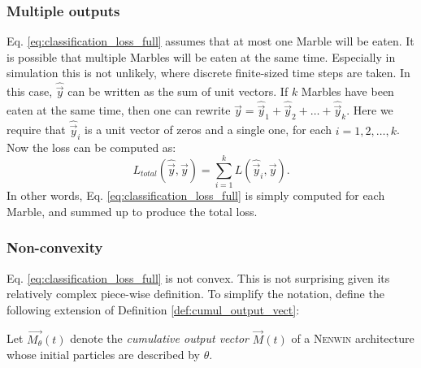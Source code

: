 \subsubsection{Multiple outputs}
Eq. \eqref{eq:classification_loss_full} assumes that at most one Marble will be eaten. It is possible that multiple Marbles will be eaten at the same time. Especially in simulation this is not unlikely, where discrete finite-sized time steps are taken. In this case, $\hat{\vec{y}}$ can be written as the sum of unit vectors. If $k$ Marbles have been eaten at the same time, then one can rewrite $\hat{\vec{y}} = \hat{\vec{y}}_1 + \hat{\vec{y}}_2 + \dots + \hat{\vec{y}}_k$. Here we require that $\hat{\vec{y}}_i$ is a unit vector of zeros and a single one, for each $i=1, 2, \dots, k$. Now the loss can be computed as:
\begin{equation}
	L_{total}(\hat{\vec{y}}, \vec{y}) = \sum_{i=1}^{k} L(\hat{\vec{y}}_i, \vec{y}).
	\label{eq:classification_loss_multi_output}
\end{equation}
In other words, Eq. \eqref{eq:classification_loss_full} is simply computed for each Marble, and summed up to produce the total loss. 

\subsubsection{Non-convexity}
Eq. \eqref{eq:classification_loss_full} is not convex. This is not surprising given its relatively complex piece-wise definition. To simplify the notation, define the following extension of Definition \ref{def:cumul_output_vect}:

\begin{definition}
    Let $\vec{M_{\theta}}(t)$ denote the \emph{cumulative output vector} $\vec{M}(t)$ of a \textsc{Nenwin} architecture whose initial particles are described by $\theta$.
\end{definition}

